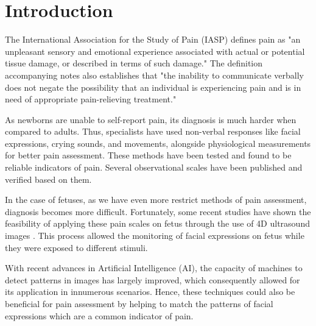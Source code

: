 \documentclass[msc]{ppgccufmg}
\begin{document}

\chapter{Introduction}

The International Association for the Study of Pain (IASP) defines pain as "an unpleasant sensory and emotional experience associated with actual or potential tissue damage, or described in terms of such damage." \citep{merskey1994classification} The definition accompanying notes also establishes that "the inability to communicate verbally does not negate the possibility that an individual is experiencing pain and is in need of appropriate pain-relieving treatment."

As newborns are unable to self-report pain, its diagnosis is much harder when compared to adults. Thus, specialists have used non-verbal responses like facial expressions, crying sounds, and movements, alongside physiological measurements for better pain assessment. These methods have been tested and found to be reliable indicators of pain. Several observational scales have been published and verified based on them.

In the case of fetuses, as we have even more restrict methods of pain assessment, diagnosis becomes more difficult. Fortunately, some recent studies have shown the feasibility of applying these pain scales on fetus through the use of 4D ultrasound images \citep{bernardes2018feasibility}. This process allowed the monitoring of facial expressions on fetus while they were exposed to different stimuli.

With recent advances in Artificial Intelligence (AI), the capacity of machines to detect patterns in images has largely improved, which consequently allowed for its application in innumerous scenarios. Hence, these techniques could also be beneficial for pain assessment by helping to match the patterns of facial expressions which are a common indicator of pain.
\end{document}
